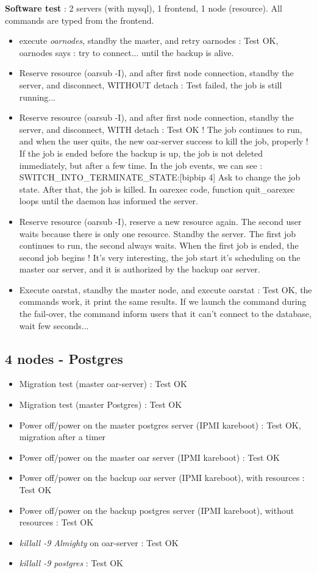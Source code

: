 \documentclass[a4paper,10pt]{report}
\begin{document}
\textbf{Software test} : 2 servers (with mysql), 1 frontend, 1 node (resource). All commands are typed from the frontend.
\begin{itemize}
 \item execute \textit{oarnodes}, standby the master, and retry oarnodes : Test OK, oarnodes says : try to connect... until the backup is alive.
 \item Reserve resource (oarsub -I), and after first node connection, standby the server, and disconnect, WITHOUT detach : Test failed, the job is still running...
 \item Reserve resource (oarsub -I), and after first node connection, standby the server, and disconnect, WITH detach : Test OK ! The job continues to run, and when the user quits, the new oar-server success to kill the job, properly !
If the job is ended before the backup is up, the job is not deleted immediately, but after a few time. In the job events, we  can see : SWITCH\_INTO\_TERMINATE\_STATE:[bipbip 4] Ask to change the job state. After that, the job is killed.
In oarexec code, function quit\_oarexec loops until the daemon has informed the server.
 \item Reserve resource (oarsub -I), reserve a new resource again. The second user waits because there is only one resource. Standby the server. The first job continues to run, the second always waits. When the first job is ended, the second job begins ! It's very interesting, the job start it's scheduling on the master oar server, and it is authorized  by the backup oar server.
 \item Execute oarstat, standby the master node, and execute oarstat : Test OK, the commands work, it print the same results. If we launch the command during the fail-over, the command inform users that it can't connect to the database, wait few seconds...
\end{itemize}


\subsection{4 nodes - Postgres}
\begin{itemize}
 \item Migration test (master oar-server) : Test OK
 \item Migration test (master Postgres) : Test OK
 \item Power off/power on the master postgres server (IPMI kareboot) : Test OK, migration after a timer
 \item Power off/power on the master oar server (IPMI kareboot) : Test OK
 \item Power off/power on the backup oar server (IPMI kareboot), with resources : Test OK
 \item Power off/power on the backup postgres server (IPMI kareboot), without resources : Test OK
 \item \textit{killall -9 Almighty} on oar-server : Test OK
 \item \textit{killall -9 postgres} : Test OK
\end{itemize}
\end{document}
